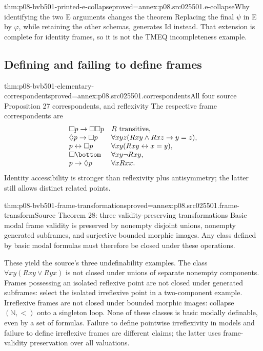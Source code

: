 \begin{hbtheorem}{thm:p08-bvb501-printed-e-collapse}{proved=annex:p08.src025501.e-collapse}{Why identifying the two E arguments changes the theorem}
Replacing the final \(\psi\) in E by \(\varphi\), while
retaining the other schemas, generates Id instead. That extension is
complete for identity frames, so it is not the TMEQ incompleteness example.
\end{hbtheorem}

\subsection{Defining and failing to define frames}
\label{sec:p08-bvb501-frame-definability}

\begin{hbtheorem}{thm:p08-bvb501-elementary-correspondents}{proved=annex:p08.src025501.correspondents}{All four source Proposition 27 correspondents, and reflexivity}
The respective frame correspondents are
\[
 \begin{array}{ll}
 \Box p\to\Box\Box p & R\text{ transitive},\\
 \Diamond p\to\Box p & \forall xyz(Rxy\land Rxz\to y=z),\\
 p\leftrightarrow\Box p & \forall xy(Rxy\leftrightarrow x=y),\\
 \Box\bottom & \forall xy\neg Rxy,\\
 p\to\Diamond p & \forall xRxx.
 \end{array}
\]
Identity accessibility is stronger than reflexivity plus antisymmetry;
the latter still allows distinct related points.
\end{hbtheorem}

\begin{hbtheorem}{thm:p08-bvb501-frame-transformations}{proved=annex:p08.src025501.frame-transform}{Source Theorem 28: three validity-preserving transformations}
Basic modal frame validity is preserved by nonempty disjoint unions,
nonempty generated subframes, and surjective bounded morphic images.
Any class defined by basic modal formulas must therefore be closed
under these operations.
\end{hbtheorem}

These yield the source's three undefinability examples. The class
\(\forall xy(Rxy\lor Ryx)\) is not closed under unions of
separate nonempty components. Frames possessing an isolated reflexive
point are not closed under generated subframes: select the isolated
irreflexive point in a two-component example. Irreflexive frames are
not closed under bounded morphic images: collapse \((\mathbb N,<)\)
onto a singleton loop. None of these classes is basic modally definable,
even by a set of formulas. Failure to define pointwise irreflexivity
in models and failure to define irreflexive frames are different claims;
the latter uses frame-validity preservation over all valuations.

